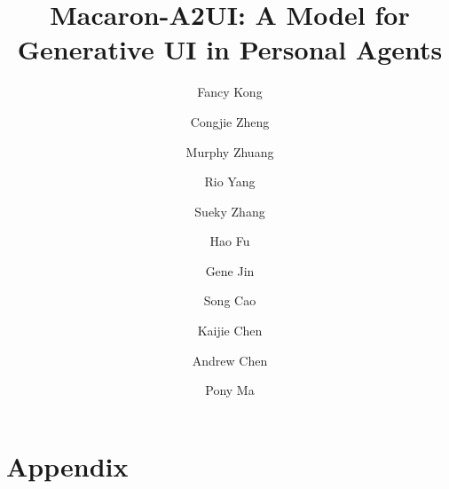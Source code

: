 \documentclass{mindlab}
\title{Macaron-A2UI: A Model for Generative UI in Personal Agents}
\author{Fancy Kong}
\author{Congjie Zheng}
\author{Murphy Zhuang}
\author{Rio Yang}
\author{Sueky Zhang}
\author{Hao Fu}
\author{Gene Jin}
\author{Song Cao}
\author{Kaijie Chen}
\author{Andrew Chen}
\author{Pony Ma}
\affiliation{\small{Mind Lab}}
\begin{document}
\maketitle













\appendix
\section{Appendix}




\end{document}
